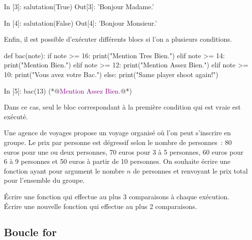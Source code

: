 \documentclass{magnoliaold}
\begin{document}
\begin{pythoncode}
In [3]: salutation(True)
Out[3]: 'Bonjour Madame.'

In [4]: salutation(False)
Out[4]: 'Bonjour Monsieur.'
\end{pythoncode}


Enfin, il est possible d'exécuter différents blocs si l'on a plusieurs conditions.

\begin{pythoncodeline}
def bac(note):
    if note >= 16:
        print("Mention Tres Bien.")
    elif note >= 14:
        print("Mention Bien.")
    elif note >= 12:
        print("Mention Assez Bien.")
    elif note >= 10:
        print("Vous avez votre Bac.")
    else:
        print("Same player shoot again!")
\end{pythoncodeline}

\begin{pythoncode}
In [5]: bac(13)
(*@\textcolor{purple}{Mention Assez Bien.}@*)
\end{pythoncode}

\noindent
Dans ce cas, seul le bloc correspondant à la première condition qui est vraie est exécuté. 

\begin{exoUnique}
\exo Une agence de voyages propose un voyage organisé où l'on peut s'inscrire en groupe.
Le prix par personne est dégressif selon le nombre de personnes~: 80 euros
pour une ou deux personnes, 70 euros pour 3 à 5 personnes, 60 euros pour 6 à 9 personnes et
50 euros à partir de 10 personnes. On souhaite écrire une fonction ayant pour argument le 
nombre $n$ de personnes et renvoyant le prix total pour l'ensemble du groupe.
\begin{questions}
\question Écrire une fonction qui effectue au plus 3 comparaisons à chaque exécution.
\question Écrire une nouvelle fonction qui effectue au plus 2 comparaisons.
\end{questions}
\end{exoUnique}

\subsection{Boucle for}
\end{document}
